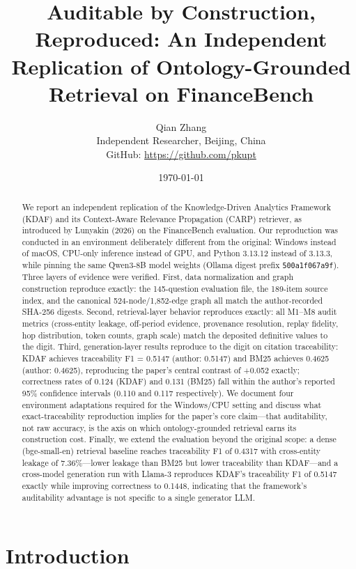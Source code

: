 \documentclass[11pt]{article}
\title{Auditable by Construction, Reproduced: An Independent Replication of Ontology-Grounded Retrieval on FinanceBench}
\author{Qian Zhang\\
  \small Independent Researcher, Beijing, China\\
  \small GitHub: \url{https://github.com/pkupt}}
\date{\today}
\begin{document}
\maketitle

\begin{abstract}
We report an independent replication of the Knowledge-Driven Analytics Framework (KDAF) and its Context-Aware Relevance Propagation (CARP) retriever, as introduced by Lunyakin (2026) on the FinanceBench evaluation. Our reproduction was conducted in an environment deliberately different from the original: Windows instead of macOS, CPU-only inference instead of GPU, and Python 3.13.12 instead of 3.13.3, while pinning the same Qwen3-8B model weights (Ollama digest prefix \texttt{500a1f067a9f}). Three layers of evidence were verified. First, data normalization and graph construction reproduce exactly: the 145-question evaluation file, the 189-item source index, and the canonical 524-node/1,852-edge graph all match the author-recorded SHA-256 digests. Second, retrieval-layer behavior reproduces exactly: all M1--M8 audit metrics (cross-entity leakage, off-period evidence, provenance resolution, replay fidelity, hop distribution, token counts, graph scale) match the deposited definitive values to the digit. Third, generation-layer results reproduce to the digit on citation traceability: KDAF achieves traceability F1 = 0.5147 (author: 0.5147) and BM25 achieves 0.4625 (author: 0.4625), reproducing the paper's central contrast of +0.052 exactly; correctness rates of 0.124 (KDAF) and 0.131 (BM25) fall within the author's reported 95\% confidence intervals (0.110 and 0.117 respectively). We document four environment adaptations required for the Windows/CPU setting and discuss what exact-traceability reproduction implies for the paper's core claim---that auditability, not raw accuracy, is the axis on which ontology-grounded retrieval earns its construction cost. Finally, we extend the evaluation beyond the original scope: a dense (bge-small-en) retrieval baseline reaches traceability F1 of 0.4317 with cross-entity leakage of 7.36\%---lower leakage than BM25 but lower traceability than KDAF---and a cross-model generation run with Llama-3 reproduces KDAF's traceability F1 of 0.5147 exactly while improving correctness to 0.1448, indicating that the framework's auditability advantage is not specific to a single generator LLM.
\end{abstract}

\section{Introduction}
\end{document}
